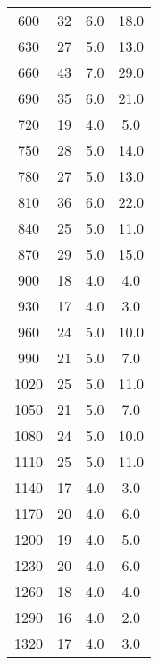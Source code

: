 \begin{longtable}{c c c c}
		 600   	&       32  	&  6.0 &       18.0 \\
		 630   	&       27  	&  5.0 &       13.0 \\
		 660   	&       43  	&  7.0 &       29.0 \\
		 690   	&       35  	&  6.0 &       21.0 \\
		 720   	&       19  	&  4.0 &        5.0 \\
		 750   	&       28  	&  5.0 &       14.0 \\
		 780   	&       27  	&  5.0 &       13.0 \\
		 810   	&       36  	&  6.0 &       22.0 \\
		 840   	&       25  	&  5.0 &       11.0 \\
		 870   	&       29  	&  5.0 &       15.0 \\
		 900   	&       18  	&  4.0 &        4.0 \\
		 930   	&       17  	&  4.0 &        3.0 \\
		 960   	&       24  	&  5.0 &       10.0 \\
		 990   	&       21  	&  5.0 &        7.0 \\
		1020   	&       25  	&  5.0 &       11.0 \\
		1050   	&       21  	&  5.0 &        7.0 \\
		1080   	&       24  	&  5.0 &       10.0 \\
		1110   	&       25  	&  5.0 &       11.0 \\
		1140   	&       17  	&  4.0 &        3.0 \\
		1170   	&       20  	&  4.0 &        6.0 \\
		1200   	&       19  	&  4.0 &        5.0 \\
		1230   	&       20  	&  4.0 &        6.0 \\
		1260   	&       18  	&  4.0 &        4.0 \\
		1290   	&       16  	&  4.0 &        2.0 \\
		1320   	&       17  	&  4.0 &        3.0 \\
\end{longtable}

